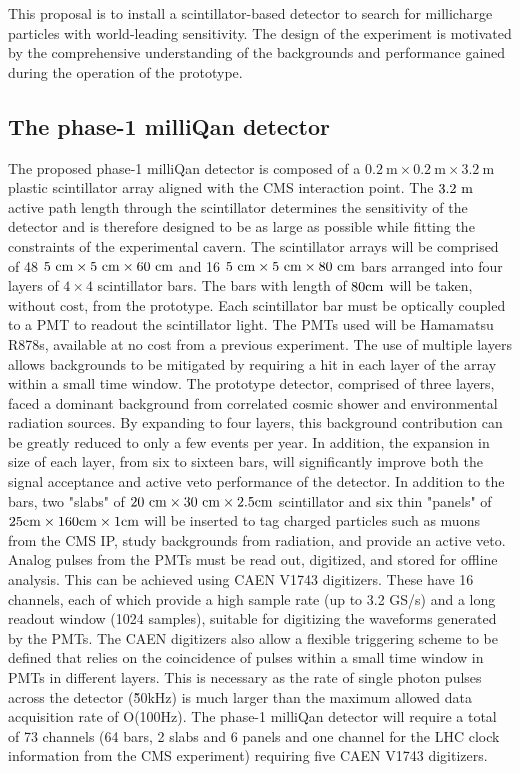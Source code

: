 \documentclass[11pt]{article}
\theoremstyle{plain} \numberwithin{equation}{section}
\theoremstyle{definition}
\begin{document}
This proposal is to install a scintillator-based detector
to search for millicharge particles with world-leading sensitivity.
The design of the experiment is motivated by 
the comprehensive understanding of the backgrounds and performance gained during the
operation of the prototype.

\subsection*{The phase-1 milliQan detector}

The proposed phase-1 milliQan detector is
composed of a $0.2~\mathrm{m}\times0.2~\mathrm{m}\times3.2~\mathrm{m}$ plastic scintillator array aligned with 
the CMS interaction point. The $3.2~\rm{m}$ active path length through the scintillator determines the sensitivity 
of the detector and is therefore designed to be as large as possible while fitting the constraints of the experimental cavern.
The scintillator arrays will be comprised of 48 $5~\rm{cm}\times5~\rm{cm}\times60~\rm{cm}$ 
and 16 $5~\rm{cm}\times5~\rm{cm}\times80~\rm{cm}$ bars arranged into four layers of $4\times4$ scintillator bars. 
The bars with length of $80\rm{cm}$ will be taken, without cost, from the prototype. Each scintillator bar must be optically
coupled to a PMT to readout the scintillator light. The PMTs used will be 
Hamamatsu R878s, available at no cost from a previous experiment. The use of multiple layers allows backgrounds to be mitigated
by requiring a hit in each layer of the array within a small time window. The prototype detector, comprised
of three layers, faced a dominant background from correlated cosmic shower and environmental radiation sources.
By expanding to four layers, this background contribution can be greatly reduced to only a few events per year.
In addition, the expansion in size of each layer, from six to sixteen bars, will significantly improve
both the signal acceptance and active veto performance of the detector. 
In addition to the bars, two "slabs" of $20~\rm{cm}\times30~\rm{cm}\times2.5\rm{cm}$ scintillator and 
six thin "panels" of $25\rm{cm}\times160\rm{cm}\times1\rm{cm}$ 
will be inserted to tag charged particles such as muons from the CMS IP, study backgrounds from radiation, 
and provide an active veto. Analog pulses from the PMTs must be read out,
digitized, and stored for offline analysis. This can be achieved using CAEN V1743 digitizers. 
These have 16 channels, each of which provide a high sample rate (up to 3.2 GS/s) and a long readout window (1024 samples), 
suitable for digitizing the waveforms generated by the PMTs. The CAEN digitizers also allow a flexible triggering
scheme to be defined that relies on the coincidence of pulses within a small time window in PMTs in different layers. This is necessary
as the rate of single photon pulses across the detector (\~50kHz) is much larger than the maximum allowed data acquisition rate of O(100Hz). 
The phase-1 milliQan detector will require a total of 73 channels (64 bars, 2 slabs and 6 panels and one channel
for the LHC clock information from the CMS experiment) requiring five CAEN V1743 digitizers. 
\end{document}
